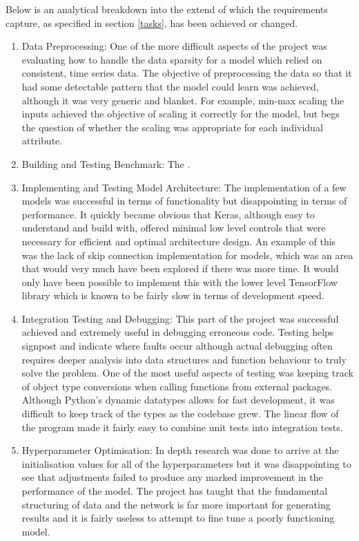 \documentclass[10pt,onecolumn,letterpaper]{article}
\begin{document}
Below is an analytical breakdown into the extend of which the requirements capture, as specified in section \ref{tasks}, has been achieved or changed. 

\begin{enumerate}
	\item Data Preprocessing: One of the more difficult aspects of the project was evaluating how to handle the data sparsity for a model which relied on consistent, time series data. The objective of preprocessing the data so that it had some detectable pattern that the model could learn was achieved, although it was very generic and blanket. For example, min-max scaling the inputs achieved the objective of scaling it correctly for the model, but begs the question of whether the scaling was appropriate for each individual attribute.  
	\item Building and Testing Benchmark: The . 
	\item Implementing and Testing Model Architecture: The implementation of a few models was successful in terms of functionality but disappointing in terms of performance. It quickly became obvious that Keras, although easy to understand and build with, offered minimal low level controls that were necessary for efficient and optimal architecture design. An example of this was the lack of skip connection implementation for models, which was an area that would very much have been explored if there was more time. It would only have been possible to implement this with the lower level TensorFlow library which is known to be fairly slow in terms of development speed.
	\item Integration Testing and Debugging: This part of the project was successful achieved and extremely useful in debugging erroneous code. Testing helps signpost and indicate where faults occur although actual debugging often requires deeper analysis into data structures and function behaviour to truly solve the problem. One of the most useful aspects of testing was keeping track of object type conversions when calling functions from external packages. Although Python's dynamic datatypes allows for fast development, it was difficult to keep track of the types as the codebase grew. The linear flow of the program made it fairly easy to combine unit tests into integration tests.
	\item Hyperparameter Optimisation: In depth research was done to arrive at the initialisation values for all of the hyperparameters but it was disappointing to see that adjustments failed to produce any marked improvement in the performance of the model. The project has taught that the fundamental structuring of data and the network is far more important for generating results and it is fairly useless to attempt to fine tune a poorly functioning model.  
\end{enumerate}
\end{document}
